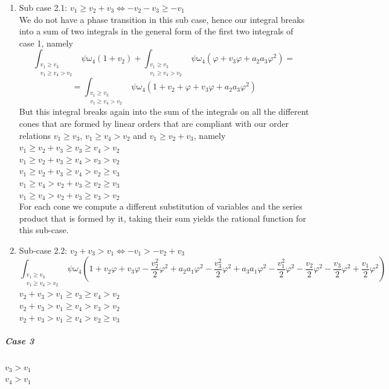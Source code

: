 \documentclass{article}
\begin{document}
\begin{enumerate}
    \item Sub case 2.1: $v_1\geq{v}_2+v_3\iff-v_2-v_3\geq-v_1$\\
    We do not have a phase transition in this sub case, hence our integral breaks into a sum of two integrals in the general form of the first two integrals of case 1, namely\\
    \[\int_{\substack{v_1\geq{v}_3\\v_1\geq{v}_4>v_2}}\psi\omega_4\left(1+v_2\right)+\int_{\substack{v_1\geq{v}_3\\v_1\geq{v}_4>v_2}}\psi\omega_4\left(\varphi+v_3\varphi+a_2a_3\varphi^2\right)=\]\[=\int_{\substack{v_1\geq{v}_3\\v_1\geq{v}_4>v_2}}\psi\omega_4\left(1+v_2+\varphi+v_3\varphi+a_2a_3\varphi^2\right)\]
    But this integral breaks again into the sum of the integrals on all the different cones that are formed by linear orders that are compliant with our order relations $v_1\geq{v_3}$, ${v_1\geq{v_4}>v_2}$ and $v_1\geq{v_2}+v_3$, namely\\
    $v_1\geq{v_2+v_3}\geq{v}_3\geq{v_4}>v_2$\\
$v_1\geq{v_2+v_3}\geq{v}_4>{v_3}>v_2$\\
$v_1\geq{v_2+v_3}\geq{v}_4>{v_2}\geq{v}_3$\\
$v_1\geq{v_4}>v_2+v_3\geq{v_2}\geq{v}_3$\\
$v_1\geq{v_4}>v_2+v_3\geq{v_3}>v_2$\\
For each cone we compute a different substitution of variables and the series product that is formed by it, taking their sum yields the rational function for this sub-case.\\
    \item Sub-case 2.2: $v_2+v_3>v_1\iff-v_1>-v_2+v_3$\\
     \[\int_{\substack{v_1\geq{v}_3\\v_1\geq{v}_4>v_2}}\psi\omega_4\left(1+v_2\varphi+v_3\varphi-\frac{v_2^2}{2}\varphi^2+a_2a_1\varphi^2-\frac{v_3^2}{2}\varphi^2+a_3a_1\varphi^2-\frac{v_1^2}{2}\varphi^2-\frac{v_2}{2}\varphi^2-\frac{v_3}{2}\varphi^2+\frac{v_1}{2}\varphi^2\right)\]
$v_2+v_3>v_1\geq{v}_3\geq{v}_4>v_2$\\
$v_2+v_3>v_1\geq{v}_4>v_3>v_2$\\
$v_2+v_3>v_1\geq{v}_4>v_2\geq{v_3}$\\
\end{enumerate}
\subparagraph{Case 3}
$v_3>v_1$\\
$v_4>v_1$\\
\end{document}
